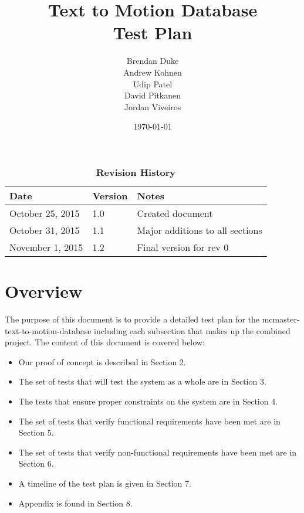 \documentclass{scrreprt}
\begin{document}
\title{\bf Text to Motion Database\\[\baselineskip]\Large Test Plan}
\author{Brendan Duke\\Andrew Kohnen\\Udip Patel\\David Pitkanen\\Jordan Viveiros}
\date{\today}
	
\maketitle

\tableofcontents
\listoftables
\listoffigures


\begin{table}[bp]
\caption*{\bf Revision History}
\begin{tabularx}{\textwidth}{p{3.5cm}p{2cm}X}
\toprule {\bf Date} & {\bf Version} & {\bf Notes}\\
\midrule
October 25, 2015 & 1.0 & Created document\\
October 31, 2015 & 1.1 & Major additions to all sections\\
November 1, 2015 & 1.2 & Final version for rev 0\\
\bottomrule
\end{tabularx}
\end{table}

\newpage


\chapter{Overview}
The purpose of this document is to provide a detailed test plan for the mcmaster-text-to-motion-database including each subsection that makes up the combined project. The content of this document is covered below:

\begin{itemize}
  \item Our proof of concept is described in Section 2.
  \item The set of tests that will test the system as a whole are in Section 3.
  \item The tests that ensure proper constraints on the system are in Section 4.
  \item The set of tests that verify functional requirements have been met are in Section 5.
  \item The set of tests that verify non-functional requirements have been met are in Section 6.
  \item A timeline of the test plan is given in Section 7.
  \item Appendix is found in Section 8.
\end{itemize} 
\end{document}
